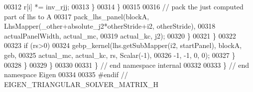 \begin{DoxyCode}
00312                   r[i] *= inv\_rjj;
00313               \}
00314             \}
00315 
00316             \textcolor{comment}{// pack the just computed part of lhs to A}
00317             pack\_lhs\_panel(blockA, LhsMapper(\_other+absolute\_j2*otherStride+i2, otherStride),
00318                            actualPanelWidth, actual\_mc,
00319                            actual\_kc, j2);
00320           \}
00321         \}
00322 
00323         \textcolor{keywordflow}{if} (rs>0)
00324           gebp\_kernel(lhs.getSubMapper(i2, startPanel), blockA, geb,
00325                       actual\_mc, actual\_kc, rs, Scalar(-1),
00326                       -1, -1, 0, 0);
00327       \}
00328     \}
00329   \}
00330 
00331 \} \textcolor{comment}{// end namespace internal}
00332 
00333 \} \textcolor{comment}{// end namespace Eigen}
00334 
00335 \textcolor{preprocessor}{#endif // EIGEN\_TRIANGULAR\_SOLVER\_MATRIX\_H}
\end{DoxyCode}
